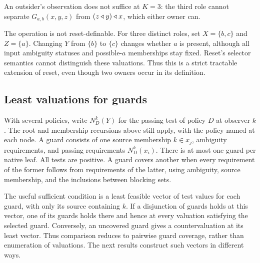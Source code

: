 An outsider's observation does not suffice at $K=3$: the third role cannot separate
$G_{a,b}(x,y,z)$ from $(z\mathbin{\triangleleft} y)\mathbin{\triangleleft} x$, which either owner can.


The operation is not reset-definable. For three distinct roles, set
$X=\{b,c\}$ and $Z=\{a\}$. Changing $Y$ from $\{b\}$ to $\{c\}$
changes whether $a$ is present, although all input ambiguity statuses
and possible-$a$ memberships stay fixed. Reset's selector semantics
cannot distinguish these valuations. Thus this is a strict tractable
extension of reset, even though two owners occur in its definition.

\subsection{Least valuations for guards}

With several policies, write $N_D^k(Y)$ for the passing test of policy
$D$ at observer $k$. The root and membership recursions above still
apply, with the policy named at each node. A guard consists of one
source membership $k\in x_j$, ambiguity requirements, and passing
requirements $N_D^k(x_i)$. There is at most one guard per native leaf.
All tests are positive. A guard covers another when every requirement
of the former follows from requirements of the latter, using
ambiguity, source membership, and the inclusions between blocking sets.

The useful sufficient condition is a least feasible vector of test
values for each guard, with only its source containing $k$.
If a disjunction of guards holds at this vector, one of its guards
holds there and hence at every valuation satisfying the selected
guard. Conversely, an uncovered guard gives a countervaluation at
its least vector. Thus comparison reduces to pairwise guard coverage,
rather than enumeration of valuations. The next results construct
such vectors in different ways.

